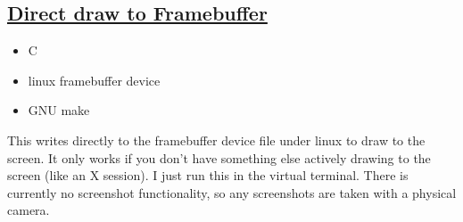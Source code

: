 \documentclass{amsart}
\theoremstyle{definition} %
\begin{document}
\subsection{\href{https://github.com/1wsx10/my_c_draw}{Direct draw to Framebuffer}}
\begin{itemize}
	\item C
	\item linux framebuffer device
	\item GNU make
\end{itemize}
This writes directly to the framebuffer device file under linux to
draw to the screen. It only works if you don't have something else
actively drawing to the screen (like an X session). I just run this
in the virtual terminal. There is currently no screenshot
functionality, so any screenshots are taken with a physical camera.



\vspace*{\fill}
\end{document}
